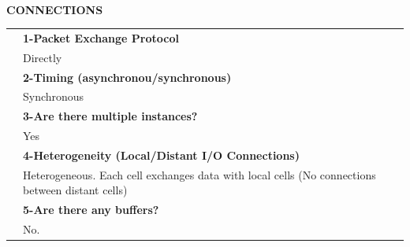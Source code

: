    \newpage{\large\textbf{ }}\vspace{10pt}\\
   {\large\textbf{CONNECTIONS}}\vspace{10pt}\\\begin{tabular}{ p{0.2cm} p{14.5cm}}
   	&\textbf{1-Packet Exchange Protocol}\\
   	&Directly\vspace{7pt}\\
   	&\textbf{2-Timing (asynchronou/synchronous)}\\
   	&Synchronous\vspace{7pt}\\
   	&\textbf{3-Are there multiple instances? }\\
   	&Yes\vspace{7pt}\\
   	&\textbf{4-Heterogeneity (Local/Distant I/O Connections)}\\
   	&Heterogeneous. Each cell exchanges data with local cells (No connections between distant cells)\vspace{7pt}\\
   	&\textbf{5-Are there any buffers?}\\
   	&No.
   \end{tabular}\vspace{14pt}\\
   